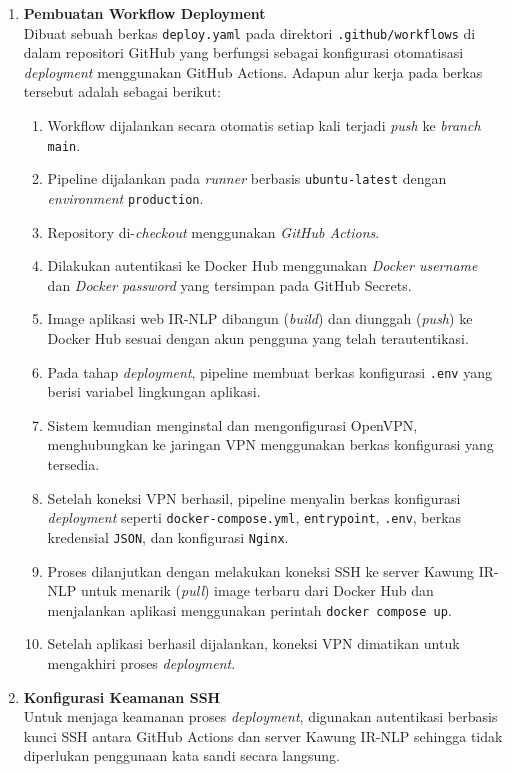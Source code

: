 \begin{enumerate}
    Pada tahap \textit{deployment}, data \textit{Base64} tersebut kemudian didekodekan kembali menjadi berkas \texttt{credentials.json} agar dapat digunakan oleh aplikasi untuk proses autentikasi Google Sheets API.
    \item \textbf{Pembuatan Workflow Deployment} \\
    Dibuat sebuah berkas \texttt{deploy.yaml} pada direktori \texttt{.github/workflows} di dalam repositori GitHub yang berfungsi sebagai konfigurasi otomatisasi \textit{deployment} menggunakan GitHub Actions. Adapun alur kerja pada berkas tersebut adalah sebagai berikut:
    \begin{enumerate}
        \item Workflow dijalankan secara otomatis setiap kali terjadi \textit{push} ke \textit{branch} \texttt{main}.
        \item Pipeline dijalankan pada \textit{runner} berbasis \texttt{ubuntu-latest} dengan \textit{environment} \texttt{production}.
        \item Repository di-\textit{checkout} menggunakan \textit{GitHub Actions}.
        \item Dilakukan autentikasi ke Docker Hub menggunakan \textit{Docker username} dan \textit{Docker password} yang tersimpan pada GitHub Secrets.
        \item Image aplikasi web IR-NLP dibangun (\textit{build}) dan diunggah (\textit{push}) ke Docker Hub sesuai dengan akun pengguna yang telah terautentikasi.
        \item Pada tahap \textit{deployment}, pipeline membuat berkas konfigurasi \texttt{.env} yang berisi variabel lingkungan aplikasi.
        \item Sistem kemudian menginstal dan mengonfigurasi OpenVPN, menghubungkan ke jaringan VPN menggunakan berkas konfigurasi yang tersedia.
        \item Setelah koneksi VPN berhasil, pipeline menyalin berkas konfigurasi \textit{deployment} seperti \texttt{docker-compose.yml}, \texttt{entrypoint}, \texttt{.env}, berkas kredensial \texttt{JSON}, dan konfigurasi \texttt{Nginx}.
        \item Proses dilanjutkan dengan melakukan koneksi SSH ke server Kawung IR-NLP untuk menarik (\textit{pull}) image terbaru dari Docker Hub dan menjalankan aplikasi menggunakan perintah \texttt{docker compose up}.
        \item Setelah aplikasi berhasil dijalankan, koneksi VPN dimatikan untuk mengakhiri proses \textit{deployment}.
    \end{enumerate}

    \item \textbf{Konfigurasi Keamanan SSH} \\
    Untuk menjaga keamanan proses \textit{deployment}, digunakan autentikasi berbasis kunci SSH antara GitHub Actions dan server Kawung IR-NLP sehingga tidak diperlukan penggunaan kata sandi secara langsung.
\end{enumerate}
